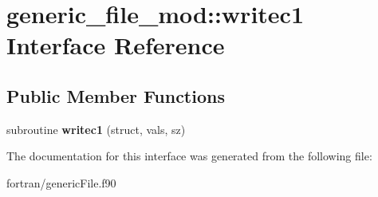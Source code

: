 \hypertarget{interfacegeneric__file__mod_1_1writec1}{}\section{generic\+\_\+file\+\_\+mod\+:\+:writec1 Interface Reference}
\label{interfacegeneric__file__mod_1_1writec1}
\subsection*{Public Member Functions}
\begin{DoxyCompactItemize}
\item 
\mbox{\label{interfacegeneric__file__mod_1_1writec1_a1facd07ff9092e79f796f34eeeb5aa37}} 
subroutine {\bfseries writec1} (struct, vals, sz)
\end{DoxyCompactItemize}


The documentation for this interface was generated from the following file\+:\begin{DoxyCompactItemize}
\item 
fortran/generic\+File.\+f90\end{DoxyCompactItemize}
